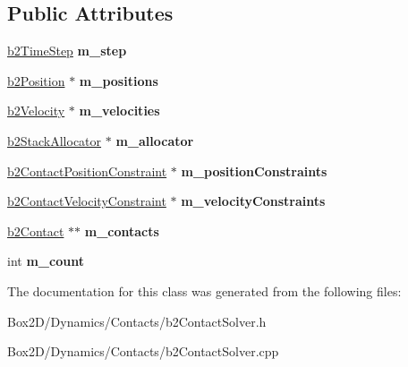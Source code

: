 \subsection*{Public Attributes}
\begin{DoxyCompactItemize}
\item 
\mbox{\label{classb2_contact_solver_aac78600ba5fd3249bac20678cbc9f101}} 
\hyperlink{structb2_time_step}{b2\+Time\+Step} {\bfseries m\+\_\+step}
\item 
\mbox{\label{classb2_contact_solver_a39b973c8311e522f44cda9053dcea5a8}} 
\hyperlink{structb2_position}{b2\+Position} $\ast$ {\bfseries m\+\_\+positions}
\item 
\mbox{\label{classb2_contact_solver_aae6dae9341dbbd780e7b3ec6b1b332f9}} 
\hyperlink{structb2_velocity}{b2\+Velocity} $\ast$ {\bfseries m\+\_\+velocities}
\item 
\mbox{\label{classb2_contact_solver_a6a2c9f5470a469e50d7f33f8d9095abe}} 
\hyperlink{classb2_stack_allocator}{b2\+Stack\+Allocator} $\ast$ {\bfseries m\+\_\+allocator}
\item 
\mbox{\label{classb2_contact_solver_ac0f4106f7cf67d185a7a4f3fd5a4e4ce}} 
\hyperlink{structb2_contact_position_constraint}{b2\+Contact\+Position\+Constraint} $\ast$ {\bfseries m\+\_\+position\+Constraints}
\item 
\mbox{\label{classb2_contact_solver_a616319ffa7ceb509b8189f07a070f7c7}} 
\hyperlink{structb2_contact_velocity_constraint}{b2\+Contact\+Velocity\+Constraint} $\ast$ {\bfseries m\+\_\+velocity\+Constraints}
\item 
\mbox{\label{classb2_contact_solver_aa1c7370d1d2681f9d49a494f9b0a38c6}} 
\hyperlink{classb2_contact}{b2\+Contact} $\ast$$\ast$ {\bfseries m\+\_\+contacts}
\item 
\mbox{\label{classb2_contact_solver_ab5b74c0fadf0d5d8997700b5ff91ea91}} 
int {\bfseries m\+\_\+count}
\end{DoxyCompactItemize}


The documentation for this class was generated from the following files\+:\begin{DoxyCompactItemize}
\item 
Box2\+D/\+Dynamics/\+Contacts/b2\+Contact\+Solver.\+h\item 
Box2\+D/\+Dynamics/\+Contacts/b2\+Contact\+Solver.\+cpp\end{DoxyCompactItemize}
